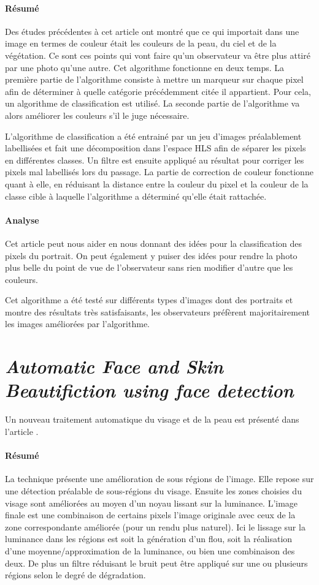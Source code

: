 \documentclass[11pt, french]{report-rd-info}
\begin{document}
\paragraph{Résumé}
Des études précédentes à cet article ont montré que ce qui importait dans une image en termes de couleur était les couleurs de la peau, du ciel et de la végétation. Ce sont ces points qui vont faire qu'un observateur va être plus attiré par une photo qu'une autre. Cet algorithme fonctionne en deux temps. La première partie de l'algorithme consiste à mettre un marqueur sur chaque pixel afin de déterminer à quelle catégorie précédemment citée il appartient. Pour cela, un algorithme de classification est utilisé. La seconde partie de l'algorithme va alors améliorer les couleurs s'il le juge nécessaire.

L'algorithme de classification a été entrainé par un jeu d'images préalablement labellisées et fait une décomposition dans l'espace HLS afin de séparer les pixels en différentes classes. Un filtre est ensuite appliqué au résultat pour corriger les pixels mal labellisés lors du passage.
La partie de correction de couleur fonctionne quant à elle, en réduisant la distance entre la couleur du pixel et la couleur de la classe cible à laquelle l'algorithme a déterminé qu'elle était rattachée.

\paragraph{Analyse}
Cet article peut nous aider en nous donnant des idées pour la classification des pixels du portrait.
On peut également y puiser des idées pour rendre la photo plus belle du point de vue de l'observateur sans rien modifier d'autre que les couleurs.

Cet algorithme a été testé sur différents types d'images dont des portraits et montre des résultats très satisfaisants, les observateurs préfèrent majoritairement les images améliorées par l'algorithme.

\section{\emph{Automatic Face and Skin Beautifiction using face detection}}
Un nouveau traitement automatique du visage et de la peau est présenté dans l’article \cite{Ciuc2010}.

\paragraph{Résumé}
La technique présente une amélioration de sous régions de l’image.  Elle repose sur une détection préalable de sous-régions du visage. Ensuite les zones choisies du visage sont améliorées au moyen d'un noyau lissant sur la luminance. L'image finale est une combinaison de certains pixels l'image originale avec ceux de la zone correspondante améliorée (pour un rendu plus naturel).
Ici le lissage sur la luminance dans les régions est soit la génération d’un flou, soit la réalisation d’une moyenne/approximation de la luminance, ou bien une combinaison des deux. De plus un filtre réduisant le bruit peut être appliqué sur une ou plusieurs régions selon le degré de dégradation.
\end{document}
